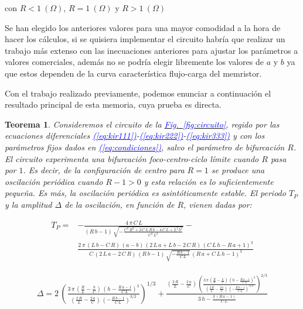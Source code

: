 \documentclass[12pt,a4paper]{report} %
\newtheorem{theorem}{Teorema}[chapter]
\newcommand{\fref}[1]{\hyperref[#1]{\textcolor{blue}{Fig.~\ref*{#1}}}}
\newcommand{\eref}[1]{\hyperref[#1]{\textcolor{blue}{(\ref*{#1})}}}
\begin{document}
	\noindent \noindent con $R<1\:(\Omega)$, $R=1\:(\Omega)$ y $R>1\:(\Omega)$
	
	\vspace{0.5cm} Se han elegido los anteriores valores para una mayor comodidad a la hora de hacer los cálculos, si se quisiera implementar el circuito habría que realizar un trabajo más extenso con las inecuaciones anteriores para ajustar los parámetros a valores comerciales, además no se podría elegir libremente los valores de $a$ y $b$ ya que estos dependen de la curva característica flujo-carga del memristor.
	
	\vspace{0.5cm} Con el trabajo realizado previamente, podemos enunciar a continuación el resultado principal de esta memoria, cuya prueba es directa.
	
	\begin{theorem}
		\label{teo.principal}
		Consideremos el circuito de la \fref{fig:circuito}, regido por las ecuaciones diferenciales \eref{eq:kir111}-\eref{eq:kir222}-\eref{eq:kir333} y con los parámetros fijos dados en \eref{eq:condiciones}, salvo el parámetro de bifurcación $R$. El circuito experimenta una bifurcación foco-centro-ciclo límite cuando $R$ pasa por $1$. Es decir, de la configuración de centro para $R=1$ se produce una oscilación periódica  cuando $R-1>0$ y esta relación es lo suficientemente pequeña. Es más, la oscilación periódica es asintóticamente estable. El periodo $T_P$ y la amplitud $\varDelta$ de la oscilación, en función de $R$, vienen dadas por:
		
		\begin{equation}
			\label{eq:perR}
			\begin{aligned}
			T_P=&-\frac{4\,\pi \,C\,L}{\left(R\,b-1\right)\,\sqrt{-\frac{C^2\,R^2+2\,C\,L\,R\,b-4\,C\,L+L^2\,b^2}{C^2\,L^2}}}- \\
			&\frac{2\,\pi \,\left(L\,b-C\,R\right)\,\left(a-b\right)\,\left(2\,L\,a+L\,b-2\,C\,R\right)\,{\left(C\,L\,h-R\,a+1\right)}^3}{C\,\left(2\,L\,a-2\,C\,R\right)\,\left(R\,b-1\right)\,\sqrt{-\frac{R\,b-1}{C\,L}}\,{\left(R\,a+C\,L\,h-1\right)}^3}
			\end{aligned}	
		\end{equation}\smallskip
		
		\begin{equation}
			\label{eq:ampR}
			\begin{aligned}
				\varDelta=2\,{\left(\frac{3\,\pi \,\left(\frac{R}{L}-\frac{b}{C}\right)\,{\left(h-\frac{R\,a-1}{C\,L}\right)}^3}{\left(\frac{2\,R}{L}-\frac{2\,a}{C}\right)\,{\left(-\frac{R\,b-1}{C\,L}\right)}^{3/2}}\right)}^{1/3}+\frac{\left(\frac{2\,R}{L}-\frac{2\,a}{C}\right)\,{\left(\frac{3\,\pi \,\left(\frac{R}{L}-\frac{b}{C}\right)\,{\left(h-\frac{R\,a-1}{C\,L}\right)}^3}{\left(\frac{2\,R}{L}-\frac{2\,a}{C}\right)\,{\left(-\frac{R\,b-1}{C\,L}\right)}^{3/2}}\right)}^{2/3}}{3\,h-\frac{3\,\left(R\,a-1\right)}{C\,L}}
			\end{aligned}
		\end{equation}
		
		
	\end{theorem}\smallskip
	
\end{document}

